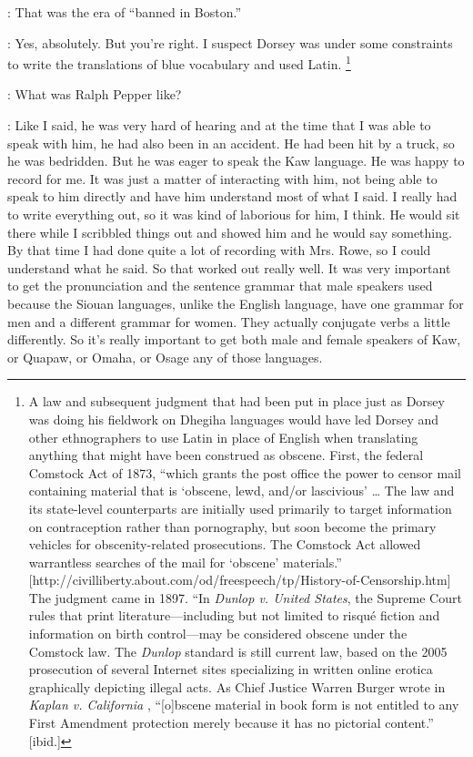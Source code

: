 \documentclass[output=paper]{LSP/langsci}
\begin{document}
: That was the era of ``banned in Boston.''

: Yes, absolutely. But you're right. I suspect Dorsey was under some constraints to write the translations of blue vocabulary and used Latin. \footnote{A law and subsequent judgment that had been put in place just as Dorsey was doing his fieldwork on Dhegiha languages would have led Dorsey and other ethnographers to use Latin in place of English when translating anything that might have been construed as obscene.  First, the federal Comstock Act of 1873, ``which grants the post office the power to censor mail containing material that is `obscene, lewd, and/or lascivious' {\ldots} The law and its state-level counterparts are initially used primarily to target information on contraception rather than pornography, but soon become the primary vehicles for obscenity-related prosecutions. The Comstock Act allowed warrantless searches of the mail for `obscene' materials.'' [{http://civilliberty.about.com/od/freespeech/tp/History-of-Censorship.htm}] The judgment came in 1897. ``In \textit{Dunlop v. United States}, the Supreme Court rules that print literature---including but not limited to risqu\'e fiction and information on birth control---may be considered obscene under the Comstock law. The \textit{Dunlop} standard is still current law, based on the 2005 prosecution of several Internet sites specializing in written online erotica graphically depicting illegal acts. As Chief Justice Warren Burger wrote in \textit{Kaplan v. California} , ``[o]bscene material in book form is not entitled to any First Amendment protection merely because it has no pictorial content.''  [ibid.] }

: What was Ralph Pepper like?

: Like I said, he was very hard of hearing and at the time that I was able to speak with him, he had also been in an accident. He had been hit by a truck, so he was bedridden. But he was eager to speak the Kaw language. He was happy to record for me. It was just a matter of interacting with him, not being able to speak to him directly and have him understand most of what I said. I really had to write everything out, so it was kind of laborious for him, I think. He would sit there while I scribbled things out and showed him and he would say something. By that time I had done quite a lot of recording with Mrs. Rowe, so I could understand what he said. So that worked out really well. It was very important to get the pronunciation and the sentence grammar that male speakers used because the Siouan languages, unlike the English language, have one grammar for men and a different grammar for women. They actually conjugate verbs a little differently. So it's really important to get both male and female speakers of Kaw, or Quapaw, or Omaha, or Osage any of those languages.
\end{document}
